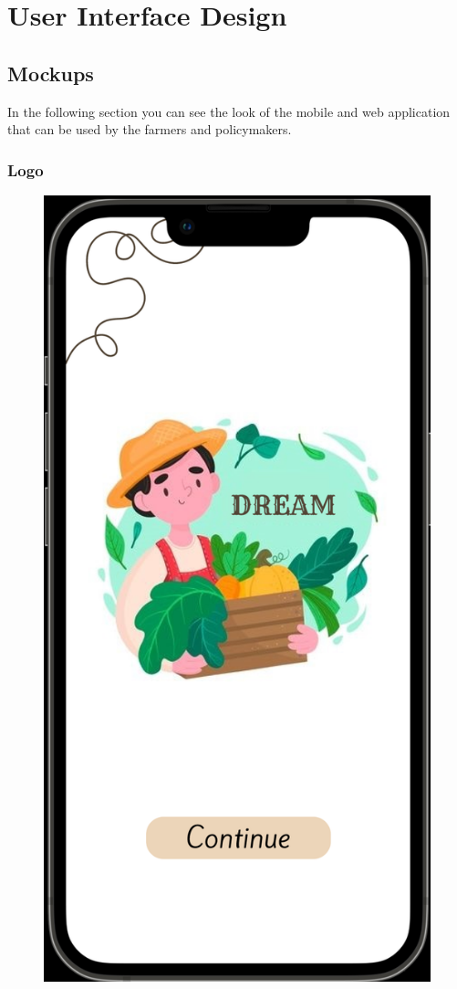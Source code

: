 \section{User Interface Design}
\subsection{Mockups}
In the following section you can see the look of the mobile and web application that can be used by the farmers and policymakers.

\subsubsection{Logo}
\begin{figure}[ht]
    \centering
    \includegraphics[width = 0.6\linewidth]{figures/logo.png}
    \label{fig:logo}
\end{figure}
\clearpage

